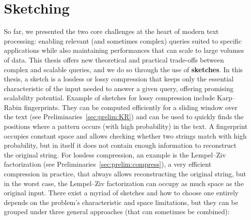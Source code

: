 \section{Sketching}\label{intro:sec:sketching}
%

So far, we presented the two core challenges at the heart of modern text processing: enabling relevant (and sometimes complex) queries suited to specific applications while also maintaining performances that can scale to large volumes of data.
%
This thesis offers new theoretical and practical trade-offs between complex and scalable queries, and we do so through the use of \textbf{sketches}.
%
In this thesis, a sketch is a lossless or lossy compression that keeps only the essential characteristic of the input needed to answer a given query, offering promising scalability potential. 
Example of sketches for lossy compression include Karp--Rabin fingerprints. They can be computed efficiently for a sliding window over the text (see Preliminaries~\ref{sec:prelim:KR}) and can be used to quickly finds the positions where a pattern occurs (with high probability) in the text. A fingerprint occupies constant space and allows checking whether two strings match with high probability, but in itself it does not contain enough information to reconstruct the original string.
For lossless compression, an example is the Lempel--Ziv factorization (see Preliminaries~\ref{sec:prelim:compress}), a very efficient compression in practice, that always allows reconstructing the original string, but in the worst case, the Lempel--Ziv factorization can occupy as much space as the original input.
There exist a myriad of sketches and how to choose one entirely depends on the problem's characteristic and space limitations, but they can be grouped under three general approaches (that can sometimes be combined):



